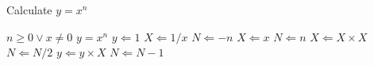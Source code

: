 \begin{algorithm}                      %
\caption{Calculate $y = x^n$}          %
\label{alg1}                           %
\begin{algorithmic}                    %
    \REQUIRE $n \geq 0 \vee x \neq 0$
	    \ENSURE $y = x^n$
		    \STATE $y \Leftarrow 1$
				        \STATE $X \Leftarrow 1 / x$
						        \STATE $N \Leftarrow -n$
								    \ELSE
									        \STATE $X \Leftarrow x$
											        \STATE $N \Leftarrow n$
													    \ENDIF
																	            \STATE $X \Leftarrow X \times X$
																				            \STATE $N \Leftarrow N / 2$
																							        \ELSE[$N$ is odd]
																									            \STATE $y \Leftarrow y \times X$
																												            \STATE $N \Leftarrow N - 1$
																															        \ENDIF
																																	    \ENDWHILE
																																		\end{algorithmic}
																																		\end{algorithm}
